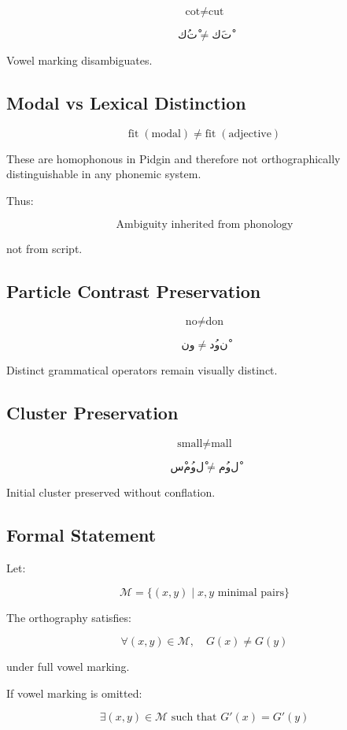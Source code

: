 \documentclass[12pt]{article}
\begin{document}
\[
\text{cot} \neq \text{cut}
\]

\[
كُتْ \neq كَتْ
\]

Vowel marking disambiguates.

\subsection{Modal vs Lexical Distinction}

\[
\text{fit} \; (\text{modal}) \neq \text{fit} \; (\text{adjective})
\]

These are homophonous in Pidgin and therefore not orthographically distinguishable in any phonemic system.

Thus:

\[
\text{Ambiguity inherited from phonology}
\]

not from script.

\subsection{Particle Contrast Preservation}

\[
\text{no} \neq \text{don}
\]

\[
نو \neq دُونْ
\]

Distinct grammatical operators remain visually distinct.

\subsection{Cluster Preservation}

\[
\text{small} \neq \text{mall}
\]

\[
سْمُولْ \neq مُولْ
\]

Initial cluster preserved without conflation.

\subsection{Formal Statement}

Let:

\[
\mathcal{M} = \{(x,y) \mid x,y \text{ minimal pairs}\}
\]

The orthography satisfies:

\[
\forall (x,y) \in \mathcal{M}, \quad G(x) \neq G(y)
\]

under full vowel marking.

If vowel marking is omitted:

\[
\exists (x,y) \in \mathcal{M} \text{ such that } G'(x) = G'(y)
\]
\end{document}
